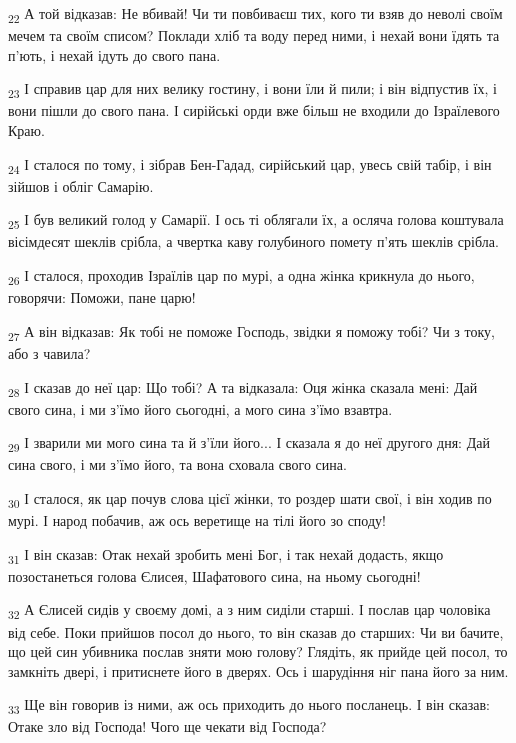 \begin{tcolorbox}
\textsubscript{22} А той відказав: Не вбивай! Чи ти повбиваєш тих, кого ти взяв до неволі своїм мечем та своїм списом? Поклади хліб та воду перед ними, і нехай вони їдять та п'ють, і нехай ідуть до свого пана.
\end{tcolorbox}
\begin{tcolorbox}
\textsubscript{23} І справив цар для них велику гостину, і вони їли й пили; і він відпустив їх, і вони пішли до свого пана. І сирійські орди вже більш не входили до Ізраїлевого Краю.
\end{tcolorbox}
\begin{tcolorbox}
\textsubscript{24} І сталося по тому, і зібрав Бен-Гадад, сирійський цар, увесь свій табір, і він зійшов і обліг Самарію.
\end{tcolorbox}
\begin{tcolorbox}
\textsubscript{25} І був великий голод у Самарії. І ось ті облягали їх, а осляча голова коштувала вісімдесят шеклів срібла, а чвертка каву голубиного помету п'ять шеклів срібла.
\end{tcolorbox}
\begin{tcolorbox}
\textsubscript{26} І сталося, проходив Ізраїлів цар по мурі, а одна жінка крикнула до нього, говорячи: Поможи, пане царю!
\end{tcolorbox}
\begin{tcolorbox}
\textsubscript{27} А він відказав: Як тобі не поможе Господь, звідки я поможу тобі? Чи з току, або з чавила?
\end{tcolorbox}
\begin{tcolorbox}
\textsubscript{28} І сказав до неї цар: Що тобі? А та відказала: Оця жінка сказала мені: Дай свого сина, і ми з'їмо його сьогодні, а мого сина з'їмо взавтра.
\end{tcolorbox}
\begin{tcolorbox}
\textsubscript{29} І зварили ми мого сина та й з'їли його... І сказала я до неї другого дня: Дай сина свого, і ми з'їмо його, та вона сховала свого сина.
\end{tcolorbox}
\begin{tcolorbox}
\textsubscript{30} І сталося, як цар почув слова цієї жінки, то роздер шати свої, і він ходив по мурі. І народ побачив, аж ось веретище на тілі його зо споду!
\end{tcolorbox}
\begin{tcolorbox}
\textsubscript{31} І він сказав: Отак нехай зробить мені Бог, і так нехай додасть, якщо позостанеться голова Єлисея, Шафатового сина, на ньому сьогодні!
\end{tcolorbox}
\begin{tcolorbox}
\textsubscript{32} А Єлисей сидів у своєму домі, а з ним сиділи старші. І послав цар чоловіка від себе. Поки прийшов посол до нього, то він сказав до старших: Чи ви бачите, що цей син убивника послав зняти мою голову? Глядіть, як прийде цей посол, то замкніть двері, і притиснете його в дверях. Ось і шарудіння ніг пана його за ним.
\end{tcolorbox}
\begin{tcolorbox}
\textsubscript{33} Ще він говорив із ними, аж ось приходить до нього посланець. І він сказав: Отаке зло від Господа! Чого ще чекати від Господа?
\end{tcolorbox}
